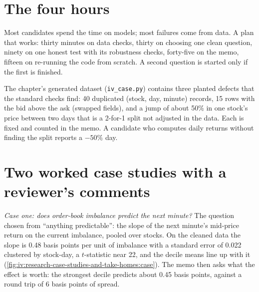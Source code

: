 \section{The four hours}

Most candidates spend the time on models; most failures come from data. A plan that works: thirty minutes on data checks,
thirty on choosing one clean question, ninety on one honest test with its robustness checks, forty-five on the memo, fifteen
on re-running the code from scratch. A second question is started only if the first is finished.

\begin{example}\label{ex:iv:research-case-studies-and-take-homes:checks}
The chapter's generated dataset (\texttt{iv\_case.py}) contains three planted defects that the standard checks find: 40
duplicated (stock, day, minute) records, 15 rows with the bid above the ask (swapped fields), and a jump of about 50\% in one
stock's price between two days that is a 2-for-1 split not adjusted in the data. Each is fixed and counted in the memo. A
candidate who computes daily returns without finding the split reports a $-50\%$ day.
\end{example}

\section{Two worked case studies with a reviewer's comments}

\emph{Case one: does order-book imbalance predict the next minute?} The question chosen from ``anything predictable'':
the slope of the next minute's mid-price return on the current imbalance, pooled over stocks. On the cleaned data the slope is
0.48 basis points per unit of imbalance with a standard error of 0.022 clustered by stock-day, a $t$-statistic near 22, and the
decile means line up with it (\cref{fig:iv:research-case-studies-and-take-homes:case}). The memo then asks what the effect is
worth: the strongest decile predicts about 0.45 basis points, against a round trip of 6 basis points of spread.

